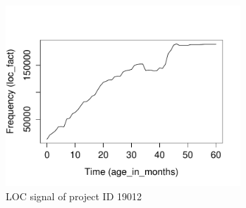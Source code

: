 \begin{figure}[h]
\caption{LOC signal of project ID 19012}\label{figure:signal}
\centering
	\includegraphics[height=192pt]{images/signal_pid_19012.pdf}
\end{figure}